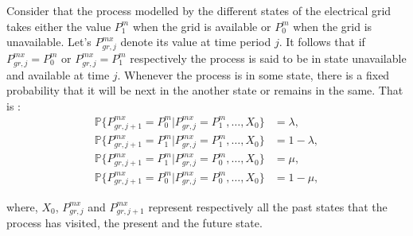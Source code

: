 \documentclass{ifacconf}
\begin{document}
Consider that the process modelled by the different states of the electrical grid takes either the value $P^m_1$ when the grid is available or $P^m_0$ when the grid is unavailable. Let's $P^{mx}_{gr,j}$ denote its value at time period $j$. It follows that if $P_{gr,j}^{mx} = P^m_0$ or $P_{gr,j}^{mx} = P^m_1$ respectively the process is said to be in state unavailable and available at time $j$. Whenever the process is in some state, there is a fixed probability that it will be next in the another state or remains in the same. That is : 
\begin{subequations}\label{eq:MarChain}
\begin{align}
    \mathbb{P} \lbrace P^{mx}_{gr,j+1} =  P^m_0 | P^{mx}_{gr,j} = P^m_1, \ldots, X_0 \rbrace  &= \lambda, \\
    \mathbb{P} \lbrace P^{mx}_{gr,j+1} =  P^m_1 | P^{mx}_{gr,j} = P^m_1, \ldots, X_0 \rbrace  &= 1-\lambda, \\
    \mathbb{P} \lbrace P^{mx}_{gr,j+1} =  P^m_1 | P^{mx}_{gr,j} = P^m_0, \ldots, X_0 \rbrace  &= \mu, \\
    \mathbb{P} \lbrace P^{mx}_{gr,j+1} =  P^m_0 | P^{mx}_{gr,j} = P^m_0, \ldots, X_0 \rbrace  &= 1-\mu,
\end{align}
\end{subequations}

where, $X_0$, $P^{mx}_{gr,j}$ and $P^{mx}_{gr,j+1}$ represent respectively all the past states that the process has visited, the present and the future state. 
\end{document}
